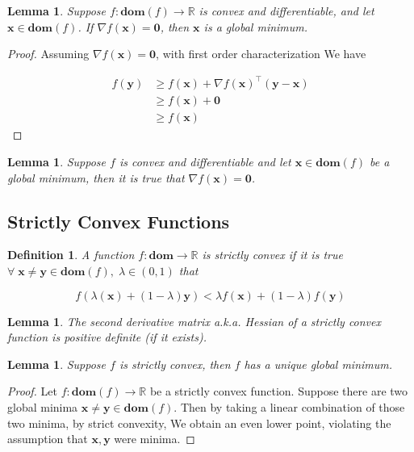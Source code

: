 \documentclass{article}
\newtheorem{definition}[theorem]{Definition}
\newtheorem{lemma}[theorem]{Lemma}
\begin{document}
	\begin{lemma}
		Suppose $f:\mathbf{dom}(f)\to\mathbb{R}$ is convex and differentiable, and let $\mathbf{x}\in\mathbf{dom}(f)$. If $\nabla f(\mathbf{x}) = \mathbf{0}$, then $\mathbf{x}$ is a global minimum.
	\end{lemma}
	
	\begin{proof}
		Assuming $\nabla f(\mathbf{x}) = \mathbf{0}$, with first order characterization We have
		
		\begin{align*}
			f(\mathbf{y}) &\ge f(\mathbf{x}) + \nabla f(\mathbf{x})^\top(\mathbf{y-x})\\
			&\ge f(\mathbf{x}) + \mathbf{0}\\
			&\ge f(\mathbf{x})
		\end{align*}
	\end{proof}
	
	\begin{lemma}
		Suppose $f$ is convex and differentiable and let $\mathbf{x}\in\mathbf{dom}(f)$ be a global minimum, then it is true that $\nabla f(\mathbf{x}) = \mathbf{0}$.
	\end{lemma}
	
	\subsection{Strictly Convex Functions}
	
		\begin{definition}
			A function $f:\mathbf{dom}\to\mathbb{R}$ is strictly convex if it is true $\forall\; \mathbf{x\neq y}\in\mathbf{dom}(f),\; \lambda\in (0,1)$ that
			
			\[ f(\lambda(\mathbf{x}) + (1-\lambda)\mathbf{y}) < \lambda f(\mathbf{x}) + (1-\lambda) f(\mathbf{y}) \]
		\end{definition}
		
		\begin{lemma}
			The second derivative matrix a.k.a. Hessian of a strictly convex function is positive definite (if it exists).
		\end{lemma}
		
		\begin{lemma}
			Suppose $f$ is strictly convex, then $f$ has a unique global minimum.
		\end{lemma}
		
		\begin{proof}
			Let $f:\mathbf{dom}(f)\to\mathbb{R}$ be a strictly convex function. Suppose there are two global minima $\mathbf{x\neq y}\in\mathbf{dom}(f)$. Then by taking a linear combination of those two minima, by strict convexity, We obtain an even lower point, violating the assumption that $\mathbf{x, y}$ were minima.
		\end{proof}
		
\end{document}
